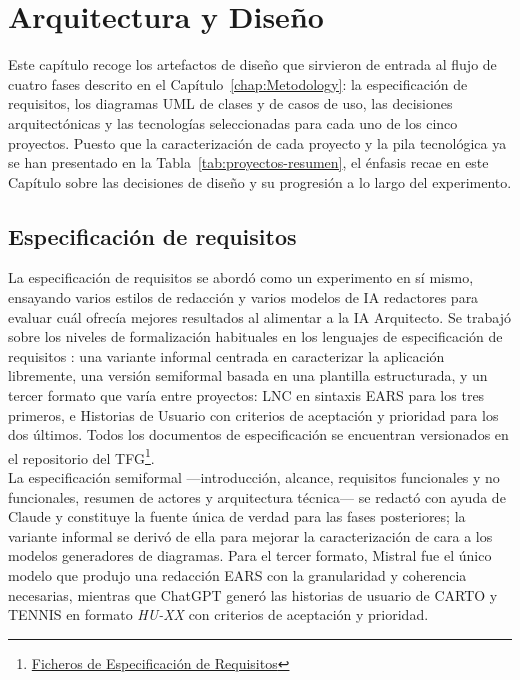 
\chapter{Arquitectura y Diseño} \label{chap:Design}

Este capítulo recoge los artefactos de diseño que sirvieron de entrada al flujo de cuatro fases descrito en el Capítulo~\ref{chap:Metodology}: la especificación de requisitos, los diagramas UML \cite{Fowler:2004:UML} de clases y de casos de uso, las decisiones arquitectónicas y las tecnologías seleccionadas para cada uno de los cinco proyectos. 
Puesto que la caracterización de cada proyecto y la pila tecnológica ya se han presentado en la Tabla~\ref{tab:proyectos-resumen}, el énfasis recae en este Capítulo sobre las decisiones de diseño y su progresión a lo largo del experimento.

\section{Especificación de requisitos} \label{sec:requirements}

La especificación de requisitos se abordó como un experimento en sí mismo, ensayando varios estilos de redacción y varios modelos de \ac{IA} redactores para evaluar cuál ofrecía mejores resultados al alimentar a la \ac{IA} Arquitecto. Se trabajó sobre los niveles de formalización habituales en los lenguajes de especificación de requisitos \cite{Sommerville:2015:SE, Pohl:2010:RE, ISO:29148:2018}: una variante informal centrada en caracterizar la aplicación libremente, una versión semiformal basada en una plantilla estructurada, y un tercer formato que varía entre proyectos: \ac{LNC} en sintaxis \ac{EARS} \cite{Mavin:2009:EARS} para los tres primeros, e Historias de Usuario \cite{Cohn:2004:UserStories} con criterios de aceptación y prioridad para los dos últimos. Todos los documentos de especificación se encuentran versionados en el repositorio del \ac{TFG}\footnote{\href{https://github.com/alu0101549491/TFG-Fabian-Gonzalez-Lence/tree/main/resources/requirement-specifications}{Ficheros de Especificación de Requisitos}}.\\

La especificación semiformal ---introducción, alcance, requisitos funcionales y no funcionales, resumen de actores y arquitectura técnica--- se redactó con ayuda de Claude y constituye la fuente única de verdad para las fases posteriores; la variante informal se derivó de ella para mejorar la caracterización de cara a los modelos generadores de diagramas. Para el tercer formato, Mistral fue el único modelo que produjo una redacción \ac{EARS} con la granularidad y coherencia necesarias, mientras que ChatGPT generó las historias de usuario de \ac{CARTO} y \ac{TENNIS} en formato \textit{HU-XX} con criterios de aceptación y prioridad.\\

